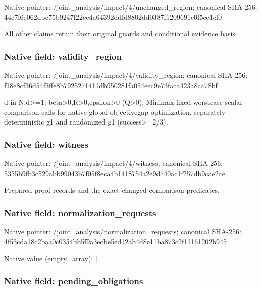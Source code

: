 \documentclass[10pt,a4paper]{article}
\begin{document}
Native pointer: /joint\_analysis/impact/4\allowbreak{}/unchanged\_region; canonical SHA-256: 44c7f6e062dbc75b9247f22c\allowbreak{}e4a64392ddfd8802dd0387f1\allowbreak{}209691e0f5ce1cf0


All other claims retain their original guards and conditional evidence basis.


\subsubsection{Native field: validity\_region}


Native pointer: /joint\_analysis/impact/4\allowbreak{}/validity\_region; canonical SHA-256: f18e8cf36d54f3ffe8b79252\allowbreak{}71411db950281fa054eec9e7\allowbreak{}3faca423a8ca78bf


d in N,d>=1; beta>0,R>0,epsilon>0 (Q>0). Minimax fixed worstcase scalar comparison calls for native global objectivegap optimization, separately deterministic g1 and randomized g1 (success>=2/3).


\subsubsection{Native field: witness}


Native pointer: /joint\_analysis/impact/4/witness; canonical SHA-256: 5355b9fb3c529abb99043b7f\allowbreak{}05f8eca4b1418754a2e9d740\allowbreak{}ac1f257db9cae2ae


Prepared proof records and the exact changed comparison predicates.


\subsubsection{Native field: normalization\_requests}


Native pointer: /joint\_analysis/normalization\_requests; canonical SHA-256: 4f53cda18c2baa0c0354bb5f\allowbreak{}9a3ecbe5ed12ab4d8e11ba87\allowbreak{}3c2f11161202b945



Native value (empty\_array): []



\subsubsection{Native field: pending\_obligations}
\end{document}
